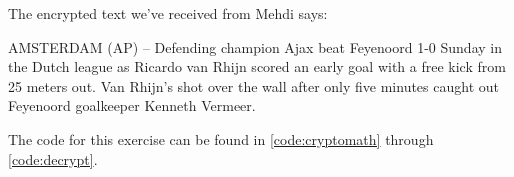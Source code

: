 The encrypted text we've received from Mehdi says:

AMSTERDAM (AP) -- Defending champion Ajax beat Feyenoord 1-0 Sunday in the Dutch league as Ricardo van Rhijn scored an early goal with a free kick from 25 meters out. Van Rhijn's shot over the wall after only five minutes caught out Feyenoord goalkeeper Kenneth Vermeer.

The code for this exercise can be found in \autoref{code:cryptomath} through \autoref{code:decrypt}.





